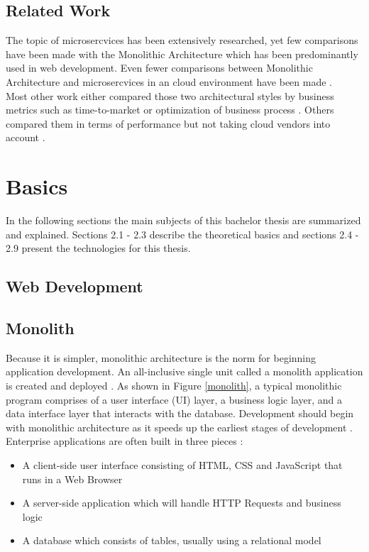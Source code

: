 \documentclass[BIF,Bachelor,nenglish]{twbook}%
\begin{document}
\section{Related Work}
The topic of microsercvices has been extensively researched, yet few comparisons have been made with the Monolithic Architecture which has been predominantly used in web development. Even fewer comparisons between Monolithic Architecture and microsercvices in an cloud environment have been made \cite{vil2015, vil2016}.
\\
Most other work either compared those two architectural styles by business metrics \cite{frommonotomicro} such as time-to-market or optimization of business process \cite{whycompanies}. Others compared them in terms of performance but not taking cloud vendors into account \cite{comp, flygare, compmonomicro}.

\chapter{Basics}
In the following sections the main subjects of this bachelor thesis are summarized and explained. Sections 2.1 - 2.3 describe the theoretical basics and sections 2.4 - 2.9 present the technologies for this thesis.

\section{Web Development}

\section{Monolith}
Because it is simpler, monolithic architecture is the norm for beginning application development. An all-inclusive single unit called a monolith application is created and deployed \cite{comp}. As shown in Figure \ref{monolith}, a typical monolithic program comprises of a user interface (UI) layer, a business logic layer, and a data interface layer that interacts with the database. Development should begin with monolithic architecture as it speeds up the earliest stages of development \cite{chllng}.
\\
Enterprise applications are often built in three pieces \cite{fow2014}:
\begin{itemize}
  \item A client-side user interface consisting of HTML, CSS and JavaScript that runs in a Web Browser
  \item A server-side application which will handle HTTP Requests and business logic
  \item A database which consists of tables, usually using a relational model
\end{itemize}
\end{document}

